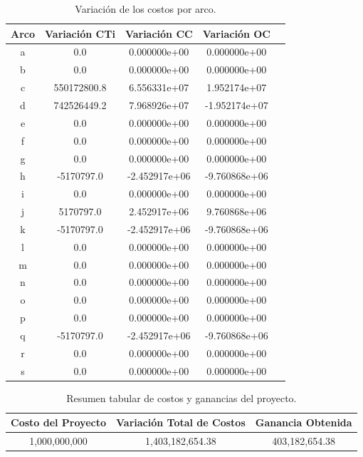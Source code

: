 \documentclass[letterpaper,12pt]{article}
\begin{document}
\begin{table}[h!]
    \centering
    \begin{tabular}{ccccc}
        \toprule
        \textbf{Arco} & \textbf{Variación CTi} & \textbf{Variación CC} & \textbf{Variación OC} \\
        \midrule
        a & 0.0         & 0.000000e+00 & 0.000000e+00 \\
        b & 0.0         & 0.000000e+00 & 0.000000e+00 \\
        c & 550172800.8 & 6.556331e+07 & 1.952174e+07 \\
        d & 742526449.2 & 7.968926e+07 & -1.952174e+07 \\
        e & 0.0         & 0.000000e+00 & 0.000000e+00 \\
        f & 0.0         & 0.000000e+00 & 0.000000e+00 \\
        g & 0.0         & 0.000000e+00 & 0.000000e+00 \\
        h & -5170797.0  & -2.452917e+06 & -9.760868e+06 \\
        i & 0.0         & 0.000000e+00 & 0.000000e+00 \\
        j & 5170797.0   & 2.452917e+06 & 9.760868e+06 \\
        k & -5170797.0  & -2.452917e+06 & -9.760868e+06 \\
        l & 0.0         & 0.000000e+00 & 0.000000e+00 \\
        m & 0.0         & 0.000000e+00 & 0.000000e+00 \\
        n & 0.0         & 0.000000e+00 & 0.000000e+00 \\
        o & 0.0         & 0.000000e+00 & 0.000000e+00 \\
        p & 0.0         & 0.000000e+00 & 0.000000e+00 \\
        q & -5170797.0  & -2.452917e+06 & -9.760868e+06 \\
        r & 0.0         & 0.000000e+00 & 0.000000e+00 \\
        s & 0.0         & 0.000000e+00 & 0.000000e+00 \\
        \bottomrule
    \end{tabular}
    \caption{Variación de los costos por arco.}
    \label{tab:variacion_costos}
\end{table}


\begin{table}[h!]
    \centering
    \begin{tabular}{ccc}
        \toprule
        \textbf{Costo del Proyecto} & \textbf{Variación Total de Costos} & \textbf{Ganancia Obtenida} \\
        \midrule
        1,000,000,000 & 1,403,182,654.38 & 403,182,654.38 \\
        \bottomrule
    \end{tabular}
    \caption{Resumen tabular de costos y ganancias del proyecto.}
    \label{tab:resumen_costos}
\end{table}
\end{document}

